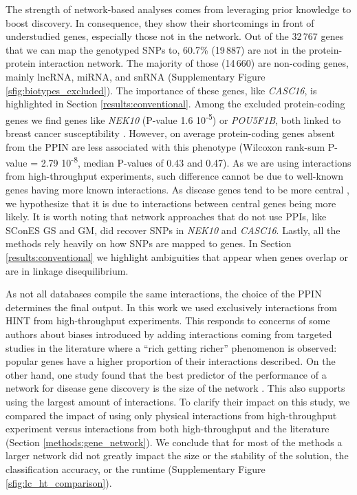 \documentclass[twocolumn, 10pt]{article}
\begin{document}
The strength of network-based analyses comes from leveraging prior knowledge to boost discovery. In consequence, they show their shortcomings in front of understudied genes, especially those not in the network. Out of the 32\,767 genes that we can map the genotyped SNPs to, 60.7\% (19\,887) are not in the protein-protein interaction network. The majority of those (14\,660) are non-coding genes, mainly lncRNA, miRNA, and snRNA (Supplementary Figure \ref{sfig:biotypes_excluded}). The importance of these genes, like \emph{CASC16}, is highlighted in Section \ref{results:conventional}. Among the excluded protein-coding genes we find genes like \emph{NEK10} (P-value 1.6 \texttimes{} 10\textsuperscript{-5}) or \emph{POU5F1B}, both linked to breast cancer susceptibility \cite{ahmed_newly_2009}. However, on average protein-coding genes absent from the PPIN are less associated with this phenotype (Wilcoxon rank-sum P-value = 2.79 \texttimes{} 10\textsuperscript{-8}, median P-values of 0.43 and 0.47). As we are using interactions from high-throughput experiments, such difference cannot be due to well-known genes having more known interactions. As disease genes tend to be more central \cite{pinero_uncovering_2016}, we hypothesize that it is due to interactions between central genes being more likely. It is worth noting that network approaches that do not use PPIs, like SConES GS and GM, did recover SNPs in \emph{NEK10} and \emph{CASC16}. Lastly, all the methods rely heavily on how SNPs are mapped to genes. In Section \ref{results:conventional} we highlight ambiguities that appear when genes overlap or are in linkage disequilibrium. 

As not all databases compile the same interactions, the choice of the PPIN determines the final output. In this work we used exclusively interactions from HINT from high-throughput experiments. This responds to concerns of some authors about biases introduced by adding interactions coming from targeted studies in the literature \cite{cai_broker_2010,das_hint:_2012} where a ``rich getting richer'' phenomenon is observed: popular genes have a higher proportion of their interactions described. On the other hand, one study found that the best predictor of the performance of a network for disease gene discovery is the size of the network \cite{huang_systematic_2018}. This also supports using the largest amount of interactions. To clarify their impact on this study, we compared the impact of using only physical interactions from high-throughput experiment versus interactions from both high-throughput and the literature (Section \ref{methods:gene_network}). We conclude that for most of the methods a larger network did not greatly impact the size or the stability of the solution, the classification accuracy, or the runtime (Supplementary Figure \ref{sfig:lc_ht_comparison}). 
\end{document}
